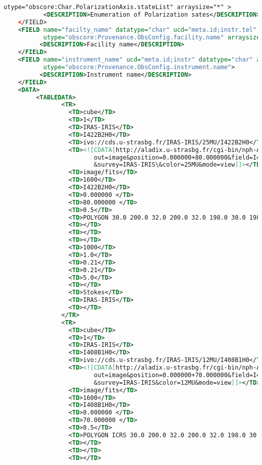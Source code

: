 \documentclass[11pt,a4paper]{ivoa}
\begin{document}
\begin{lstlisting}[basicstyle=\scriptsize,language=XML]
           utype="obscore:Char.PolarizationAxis.stateList" arraysize="*" >
           <DESCRIPTION>Enumeration of Polarization sates</DESCRIPTION>
    </FIELD>
    <FIELD name="facilty_name" datatype="char" ucd="meta.id;instr.tel"
           utype="obscore:Provenance.ObsConfig.facility.name" arraysize="*">
          <DESCRIPTION>Facility name</DESCRIPTION>
    </FIELD>
    <FIELD name="instrument_name" ucd="meta.id;instr" datatype="char" arraysize="*"
           utype="obscore:Provenance.ObsConfig.instrument.name">
          <DESCRIPTION>Instrument name</DESCRIPTION>
    </FIELD>
    <DATA>
         <TABLEDATA>
                <TR>
                  <TD>cube</TD>
                  <TD>1</TD>
                  <TD>IRAS-IRIS</TD>
                  <TD>I422B2H0</TD>
                  <TD>ivo://cds.u-strasbg.fr/IRAS-IRIS/25MU/I422B2H0</TD>
                  <TD><![CDATA[http://aladix.u-strasbg.fr/cgi-bin/nph-Aladin++dev.cgi?
                         out=image&position=0.000000+80.000000&field=I422B2H0
                         &survey=IRAS-IRIS\&color=25MU&mode=view]]></TD>
                  <TD>image/fits</TD>
                  <TD>1600</TD>
                  <TD>I422B2H0</TD>
                  <TD>0.000000 </TD>
                  <TD>80.000000 </TD>
                  <TD>0.5</TD>
                  <TD>POLYGON 30.0 200.0 32.0 200.0 32.0 198.0 30.0 198.0</TD>
                  <TD></TD>
                  <TD></TD>
                  <TD></TD>
                  <TD>1000</TD>
                  <TD>1.0</TD>
                  <TD>0.21</TD>
                  <TD>0.21</TD>
                  <TD>5.0</TD>
                  <TD></TD>
                  <TD>Stokes</TD>
                  <TD>IRAS-IRIS</TD>
                  <TD></TD>
                </TR>
                <TR>
                  <TD>cube</TD>
                  <TD>1</TD>
                  <TD>IRAS-IRIS</TD>
                  <TD>I408B1H0</TD>
                  <TD>ivo://cds.u-strasbg.fr/IRAS-IRIS/12MU/I408B1H0</TD>
                  <TD><![CDATA[http://aladix.u-strasbg.fr/cgi-bin/nph-Aladin++dev.cgi?
                         out=image&position=0.000000+70.000000&field=I408B1H0
                         &survey=IRAS-IRIS&color=12MU&mode=view]]></TD>
                  <TD>image/fits</TD>
                  <TD>1600</TD>
                  <TD>I408B1H0</TD>
                  <TD>0.000000 </TD>
                  <TD>70.000000 </TD>
                  <TD>0.5</TD>
                  <TD>POLYGON ICRS 30.0 200.0 32.0 200.0 32.0 198.0 30.0 198.0</TD>
                  <TD></TD>
                  <TD></TD>
                  <TD></TD>

\end{lstlisting}
\end{document}
